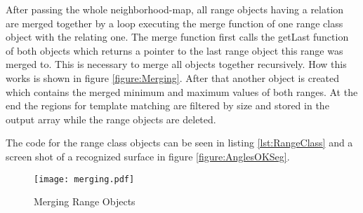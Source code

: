 After passing the whole neighborhood-map, all range objects having a relation are merged together
by a loop executing the merge function of one range class object with the relating one.
The merge function first calls the getLast function of both objects which returns a pointer to the
last range object this range was merged to. This is necessary to merge all objects together recursively.
How this works is shown in figure \vref{figure:Merging}. After that another object is created which 
contains the merged minimum and maximum values of both ranges. At the end the regions for template matching
are filtered by size and stored in the output array while the range objects are deleted. 

The code for the range class objects can be seen in listing \vref{lst:RangeClass} and a screen shot of
a recognized surface in figure \vref{figure:AnglesOKSeg}.

\begin{figure}[htp]
\begin{center}
  \texttt{[image: merging.pdf]}
  \caption{Merging Range Objects}
  \label{figure:Merging}
\end{center}
\end{figure}

